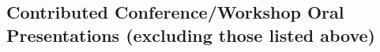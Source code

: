 \documentclass[11pt,letter]{article}
\renewenvironment{itemize}{
  \begin{list}{}{
    \setlength{\leftmargin}{1.5em}
    \setlength{\itemsep}{0.25em}
    \setlength{\parskip}{0pt}
    \setlength{\parsep}{0.25em}
  }
}{
  \end{list}
}
\begin{document}
\begin{itemize}








\end{itemize}

\subsection*{\bf \normalsize Contributed Conference/Workshop Oral Presentations (excluding those listed above)}
\end{document}
